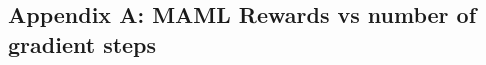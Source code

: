 \documentclass{article} %
\begin{document}
\newpage


\newpage




\newpage

%
\subsection{Appendix A: MAML Rewards vs number of gradient steps} 
\end{document}
